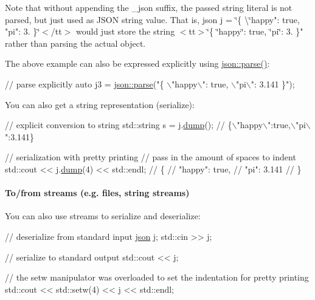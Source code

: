 Note that without appending the {\ttfamily \+\_\+json} suffix, the passed string literal is not parsed, but just used as J\+S\+ON string value. That is, {\ttfamily json j = \char`\"{}\{ \textbackslash{}\char`\"{}happy"\+: true, "pi"\+: 3. \}\char`\"{}$<$/tt$>$ would just store the string $<$tt$>$\char`\"{}\{ \char`\"{}happy\char`\"{}\+: true, \char`\"{}pi\char`\"{}\+: 3. \}"} rather than parsing the actual object.

The above example can also be expressed explicitly using {\ttfamily \hyperlink{classnlohmann_1_1basic__json_aa9676414f2e36383c4b181fe856aa3c0}{json\+::parse()}}\+:


\begin{DoxyCode}
\textcolor{comment}{// parse explicitly}
\textcolor{keyword}{auto} j3 = \hyperlink{classnlohmann_1_1basic__json_aa9676414f2e36383c4b181fe856aa3c0}{json::parse}(\textcolor{stringliteral}{"\{ \(\backslash\)"happy\(\backslash\)": true, \(\backslash\)"pi\(\backslash\)": 3.141 \}"});
\end{DoxyCode}


You can also get a string representation (serialize)\+:


\begin{DoxyCode}
\textcolor{comment}{// explicit conversion to string}
std::string s = j.\hyperlink{classnlohmann_1_1basic__json_a5adea76fedba9898d404fef8598aa663}{dump}();    \textcolor{comment}{// \{\(\backslash\)"happy\(\backslash\)":true,\(\backslash\)"pi\(\backslash\)":3.141\}}

\textcolor{comment}{// serialization with pretty printing}
\textcolor{comment}{// pass in the amount of spaces to indent}
std::cout << j.\hyperlink{classnlohmann_1_1basic__json_a5adea76fedba9898d404fef8598aa663}{dump}(4) << std::endl;
\textcolor{comment}{// \{}
\textcolor{comment}{//     "happy": true,}
\textcolor{comment}{//     "pi": 3.141}
\textcolor{comment}{// \}}
\end{DoxyCode}


\paragraph*{To/from streams (e.\+g. files, string streams)}

You can also use streams to serialize and deserialize\+:


\begin{DoxyCode}
\textcolor{comment}{// deserialize from standard input}
\hyperlink{classnlohmann_1_1basic__json}{json} j;
std::cin >> j;

\textcolor{comment}{// serialize to standard output}
std::cout << j;

\textcolor{comment}{// the setw manipulator was overloaded to set the indentation for pretty printing}
std::cout << std::setw(4) << j << std::endl;
\end{DoxyCode}


